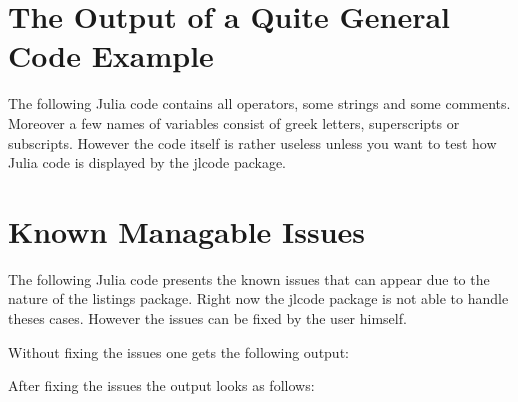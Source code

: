 \documentclass[11pt, a4paper]{scrartcl}
\begin{document}
\section*{The Output of a Quite General Code Example}
The following Julia code contains all operators, some strings and some comments.
Moreover a few names of variables consist of greek letters, superscripts or
subscripts. However the code itself is rather useless unless you want to test
how Julia code is displayed by the jlcode package.

\newpage

\section*{Known Managable Issues}
\noindent
The following Julia code presents the known issues that can appear due to the
nature of the listings package. Right now the jlcode package is not able to
handle theses cases. However the issues can be fixed by the user himself.

\vspace{2\baselineskip}\noindent
Without fixing the issues one gets the following output:


\newpage
After fixing the issues the output looks as follows:

\end{document}
